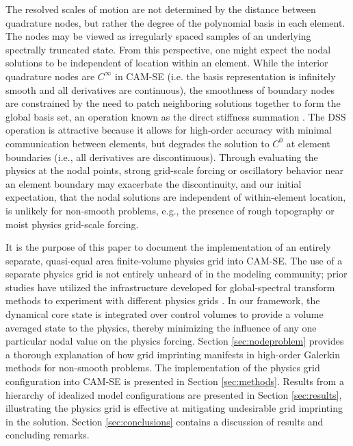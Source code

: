 \documentclass[twocol]{ametsoc}
\begin{document}
The resolved scales of motion are not determined by the distance between quadrature nodes, but rather the degree of the polynomial basis in each element. The nodes may be viewed as irregularly spaced samples of an underlying spectrally truncated state. From this perspective, one might expect the nodal solutions to be independent of location within an element. While the interior quadrature nodes are $C^{\infty}$ in CAM-SE (i.e. the basis representation is infinitely smooth and all derivatives are continuous), the smoothness of boundary nodes are constrained by the need to patch neighboring solutions together to form the global basis set, an operation known as the direct stiffness summation \citep[DSS; ][]{MadayPatera87,canuto2007}. The DSS operation is attractive because it allows for high-order accuracy with minimal communication between elements, but degrades the solution to $C^0$ at element boundaries (i.e., all derivatives are discontinuous). Through evaluating the physics at the nodal points, strong grid-scale forcing or oscillatory behavior near an element boundary may exacerbate the discontinuity, and our initial expectation, that the nodal solutions are independent of within-element location, is unlikely for non-smooth problems, e.g., the presence of rough topography or moist physics grid-scale forcing.

It is the purpose of this paper to document the implementation of an entirely separate, quasi-equal area finite-volume physics grid into CAM-SE. {\color{red}The use of a separate physics grid is not entirely unheard of in the modeling community; prior studies have utilized the infrastructure developed for global-spectral transform methods to experiment with different physics grids \citep{LH1997MWR,W1999T,W2014PTRSL}.} In our framework, the dynamical core state is integrated over control volumes to provide a volume averaged state to the physics, thereby minimizing the influence of any one particular nodal value on the physics forcing. Section \ref{sec:nodeproblem} provides a thorough explanation of how grid imprinting manifests in high-order Galerkin methods for non-smooth problems. The implementation of the physics grid configuration into CAM-SE is presented in Section \ref{sec:methods}. Results from a hierarchy of idealized model configurations are presented in Section \ref{sec:results}, illustrating the physics grid is effective at mitigating undesirable grid imprinting in the solution. Section \ref{sec:conclusions} contains a discussion of results and concluding remarks.
\end{document}
